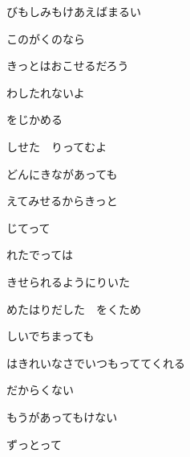 \bigskip

びもしみもけあえばまるい

このがくのなら

きっとはおこせるだろう

\bigskip

わしたれないよ

をじかめる

しせた　りってむよ

どんにきながあっても

えてみせるからきっと

じてって

\bigskip

れたでっては

きせられるようにりいた

\bigskip

めたはりだした　をくため

しいでちまっても

はきれいなさでいつもっててくれる

だからくない

もうがあってもけない

\bigskip

ずっとって
